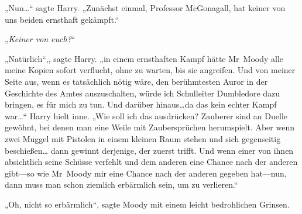 „Nun…“ sagte Harry. „Zunächst einmal, Professor McGonagall, hat keiner von uns beiden ernsthaft gekämpft.“

„\emph{Keiner von euch?}“

„Natürlich“,, sagte Harry. „in einem ernsthaften Kampf hätte Mr~Moody alle meine Kopien sofort verflucht, ohne zu warten, bis sie angreifen. Und von meiner Seite aus, wenn es tatsächlich nötig wäre, den berühmtesten Auror in der Geschichte des Amtes auszuschalten, würde ich Schulleiter Dumbledore dazu bringen, es für mich zu tun. Und darüber hinaus…da das kein echter Kampf war…“ Harry hielt inne. „Wie soll ich das ausdrücken? Zauberer sind an Duelle gewöhnt, bei denen man eine Weile mit Zaubersprüchen herumspielt. Aber wenn zwei Muggel mit Pistolen in einem kleinen Raum stehen und sich gegenseitig beschießen… dann gewinnt derjenige, der zuerst trifft. Und wenn einer von ihnen absichtlich seine Schüsse verfehlt und dem anderen eine Chance nach der anderen gibt—so wie Mr~Moody mir eine Chance nach der anderen gegeben hat—nun, dann muss man schon ziemlich erbärmlich sein, um zu verlieren.“

„Oh, nicht so erbärmlich“, sagte Moody mit einem leicht bedrohlichen Grinsen.

